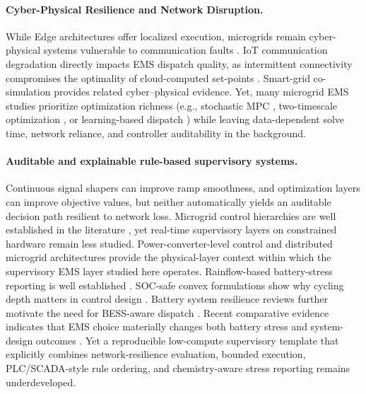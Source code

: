 \documentclass[preprint,12pt]{elsarticle}
\begin{document}
\paragraph*{Cyber-Physical Resilience and Network Disruption.}
While Edge architectures offer localized execution, microgrids remain cyber-physical systems vulnerable to communication faults \cite{ding2019cyber}. IoT communication degradation directly impacts EMS dispatch quality, as intermittent connectivity compromises the optimality of cloud-computed set-points \cite{setiawan2021iot}. Smart-grid co-simulation provides related cyber--physical evidence. Yet, many microgrid EMS studies prioritize optimization richness (e.g., stochastic MPC \cite{parisio2014model}, two-timescale optimization \cite{li2025twotimescale}, or learning-based dispatch \cite{yang2025shieldeddrl}) while leaving data-dependent solve time, network reliance, and controller auditability in the background.

\paragraph*{Auditable and explainable rule-based supervisory systems.}
Continuous signal shapers can improve ramp smoothness, and optimization layers can improve objective values, but neither automatically yields an auditable decision path resilient to network loss. Microgrid control hierarchies are well established in the literature \cite{guerrero2010hierarchical,antoniadou2016survey}, yet real-time supervisory layers on constrained hardware remain less studied. Power-converter-level control \cite{rocabert2012control,de2007hierarchical} and distributed microgrid architectures \cite{morstyn2018control,nunna2013multiagent} provide the physical-layer context within which the supervisory EMS layer studied here operates. Rainflow-based battery-stress reporting is well established \cite{gundogdu2018}. SOC-safe convex formulations show why cycling depth matters in control design \cite{he2018convex}. Battery system resilience reviews further motivate the need for BESS-aware dispatch \cite{garcia2021battery}. Recent comparative evidence indicates that EMS choice materially changes both battery stress and system-design outcomes \cite{alshammari2026emsdesign}. Yet a reproducible low-compute supervisory template that explicitly combines network-resilience evaluation, bounded execution, PLC/SCADA-style rule ordering, and chemistry-aware stress reporting remains underdeveloped.
\end{document}
